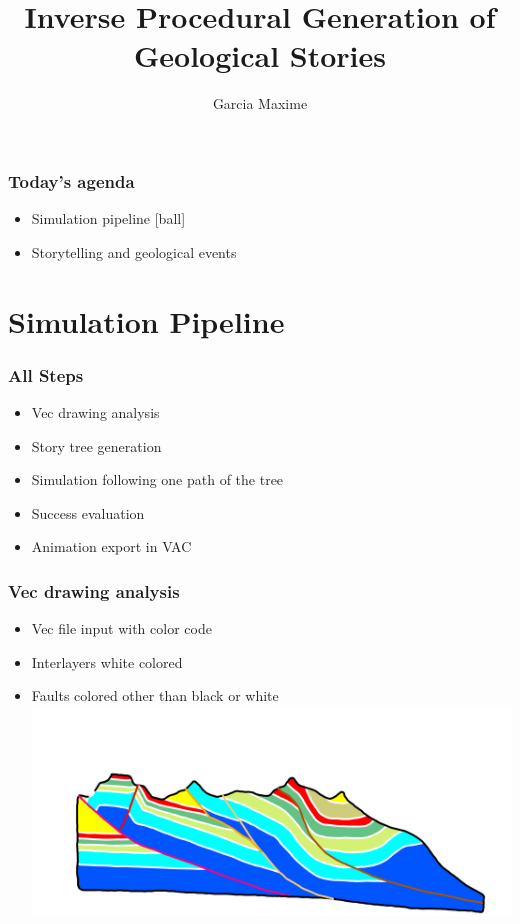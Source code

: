 \documentclass{beamer}
\title[Monthly Meeting]{Inverse Procedural Generation of Geological Stories}
\author{Garcia Maxime}
\begin{document}
	
    \begin{frame}[label=(intro)]
	\titlepage
    \end{frame}
	
	
	\begin{frame}
	\frametitle{Today's agenda}
	\begin{itemize}
	[ball]
	\item Simulation pipeline
	[ball]
	\item Storytelling and geological events 
	\end{itemize}
	\end{frame}
	
	
	\section{Simulation Pipeline}
	
	\begin{frame}
	\frametitle{All Steps}
    \begin{itemize}
    \item Vec drawing analysis
    \item Story tree generation
    \item Simulation following one path of the tree
    \item Success evaluation
    \item Animation export in VAC
    \end{itemize}
    \end{frame}

	
    \begin{frame}
    \frametitle{Vec drawing analysis}
    \begin{itemize}
    \item Vec file input with color code
    \item Interlayers white colored
    \item Faults colored other than black or white
    \includegraphics[scale=0.3]{chartreuse.png}
    \end{itemize}
    \end{frame}
\end{document}
